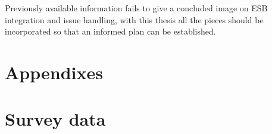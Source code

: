 \documentclass{llncs}
\begin{document}
Previously available information fails to give a concluded image on ESB integration and issue handling, with this thesis all the pieces should be incorporated so that an informed plan can be established.

\newpage



\newpage
\section*{Appendixes}
\appendix
\section{Survey data}
\end{document}
